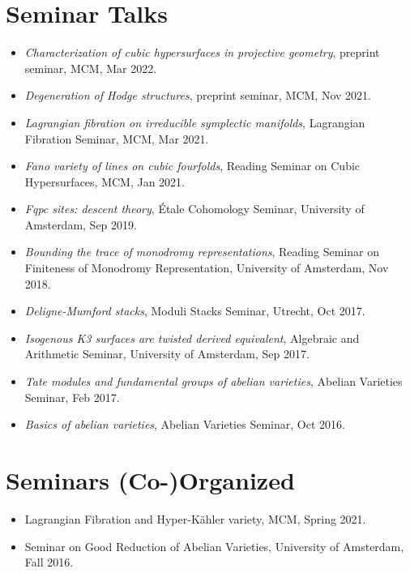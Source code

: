 \documentclass[letterpaper]{article}
\begin{document}
\section*{Seminar Talks}
\begin{itemize}
\item \textit{Characterization of cubic hypersurfaces in projective geometry},
preprint seminar, MCM, Mar 2022.

\item \textit{Degeneration of Hodge structures},
preprint seminar, MCM, Nov 2021.

\item \textit{Lagrangian fibration on irreducible symplectic manifolds},
Lagrangian Fibration Seminar, MCM, Mar 2021.

\item \textit{Fano variety of lines on cubic fourfolds},
Reading Seminar on Cubic Hypersurfaces, MCM, Jan 2021.

\item \textit{Fqpc sites: descent theory},
\'Etale Cohomology Seminar, University of Amsterdam, Sep 2019.

\item \textit{Bounding the trace of monodromy representations},
 Reading Seminar on Finiteness of Monodromy Representation, University of Amsterdam, Nov 2018.

\item\textit{ Deligne-Mumford stacks},
Moduli Stacks Seminar, Utrecht, Oct 2017.

\item \textit{Isogenous K3 surfaces are twisted derived equivalent},
Algebraic and Arithmetic Seminar, University of Amsterdam, Sep 2017.

\item\textit{ Tate modules and fundamental groups of abelian varieties},
Abelian Varieties Seminar, Feb 2017.

\item \textit{Basics of abelian varieties},
Abelian Varieties Seminar, Oct 2016.

\end{itemize}


\section*{Seminars (Co-)Organized}
\begin{itemize}

\item Lagrangian Fibration and Hyper-K\"ahler variety, MCM, Spring 2021.

\item Seminar on Good Reduction of Abelian Varieties, University of Amsterdam, Fall 2016.

\end{itemize}
\end{document}
